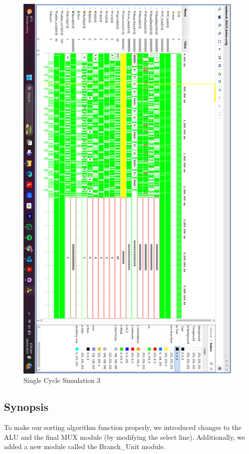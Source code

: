 \documentclass{report}
\begin{document}
\begin{figure}[h]
    \centerline{\includegraphics[scale = 0.2]{SingleCycle3.png}}
    \caption{Single Cycle Simulation 3}
\end{figure}

\subsection{Synopsis}
    To make our sorting algorithm function properly, we introduced changes to the ALU and the final MUX module (by modifying the select line). Additionally, we added a new module called the Branch\_Unit module.
\end{document}
